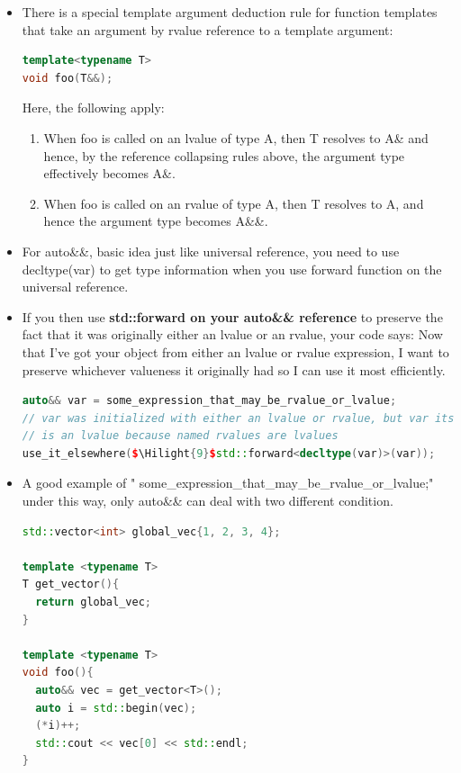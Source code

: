 \documentclass[a4paper,12pt,twoside]{book}
\newcommand{\Hilight}[1]{\makebox[0pt][l]{\color{yellow}\rule[-3pt]{#1em}{11pt}}}
\begin{document}
\begin{itemize}
\item There is a special template argument deduction rule for function templates that take an argument by rvalue reference to a template argument:
\begin{lstlisting}[frame=single, language=c++]
template<typename T>
void foo(T&&);
\end{lstlisting}
Here, the following apply:
\begin{enumerate}

\item When foo is called on an lvalue of type A, then T resolves to A\& and hence, by the reference collapsing rules above, the argument type effectively becomes A\&.

\item When foo is called on an rvalue of type A, then T resolves to A, and hence the argument type becomes A\&\&.
\end{enumerate}


\item For auto\&\&, basic idea just like universal reference, you need to use decltype(var) to get type information when you use forward function on the universal reference. 

\item If you then use \textbf{std::forward on your auto\&\& reference} to preserve the fact that it was originally either an lvalue or an rvalue, your code says: Now that I've got your object from either an lvalue or rvalue expression, I want to preserve whichever valueness it originally had so I can use it most efficiently.

\begin{lstlisting}[frame=single, language=c++]
auto&& var = some_expression_that_may_be_rvalue_or_lvalue;
// var was initialized with either an lvalue or rvalue, but var itself
// is an lvalue because named rvalues are lvalues
use_it_elsewhere($\Hilight{9}$std::forward<decltype(var)>(var));
\end{lstlisting}

\item A good example of "  some\_expression\_that\_may\_be\_rvalue\_or\_lvalue;" under this way, only auto\&\& can deal with two different condition.
\begin{lstlisting}[frame=single, language=c++]
std::vector<int> global_vec{1, 2, 3, 4};

template <typename T>
T get_vector(){
  return global_vec;
}

template <typename T>
void foo(){
  auto&& vec = get_vector<T>();
  auto i = std::begin(vec);
  (*i)++;
  std::cout << vec[0] << std::endl;
}


\end{lstlisting}
\end{itemize}
\end{document}
